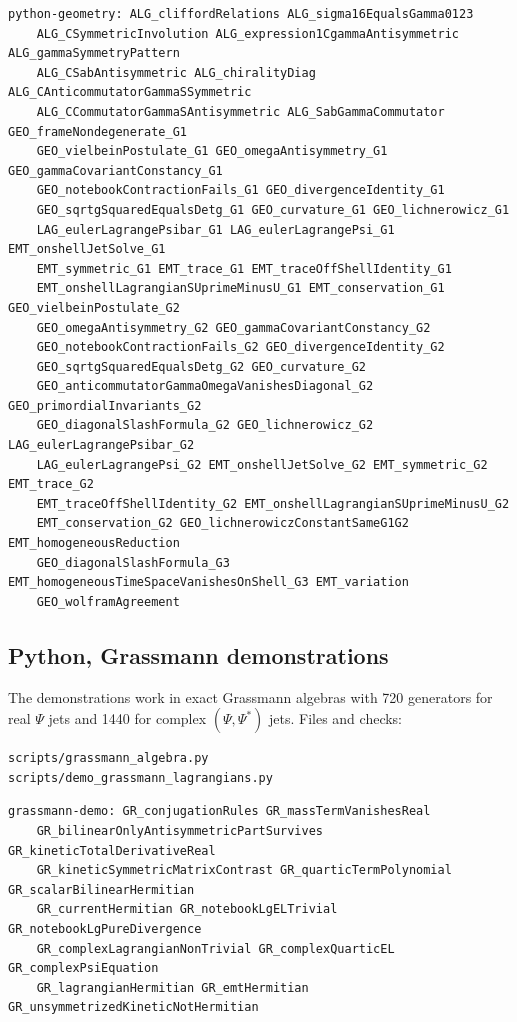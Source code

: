 \documentclass[11pt]{article}
\begin{document}
\begin{Verbatim}[fontsize=\small]
python-geometry: ALG_cliffordRelations ALG_sigma16EqualsGamma0123
    ALG_CSymmetricInvolution ALG_expression1CgammaAntisymmetric ALG_gammaSymmetryPattern
    ALG_CSabAntisymmetric ALG_chiralityDiag ALG_CAnticommutatorGammaSSymmetric
    ALG_CCommutatorGammaSAntisymmetric ALG_SabGammaCommutator GEO_frameNondegenerate_G1
    GEO_vielbeinPostulate_G1 GEO_omegaAntisymmetry_G1 GEO_gammaCovariantConstancy_G1
    GEO_notebookContractionFails_G1 GEO_divergenceIdentity_G1
    GEO_sqrtgSquaredEqualsDetg_G1 GEO_curvature_G1 GEO_lichnerowicz_G1
    LAG_eulerLagrangePsibar_G1 LAG_eulerLagrangePsi_G1 EMT_onshellJetSolve_G1
    EMT_symmetric_G1 EMT_trace_G1 EMT_traceOffShellIdentity_G1
    EMT_onshellLagrangianSUprimeMinusU_G1 EMT_conservation_G1 GEO_vielbeinPostulate_G2
    GEO_omegaAntisymmetry_G2 GEO_gammaCovariantConstancy_G2
    GEO_notebookContractionFails_G2 GEO_divergenceIdentity_G2
    GEO_sqrtgSquaredEqualsDetg_G2 GEO_curvature_G2
    GEO_anticommutatorGammaOmegaVanishesDiagonal_G2 GEO_primordialInvariants_G2
    GEO_diagonalSlashFormula_G2 GEO_lichnerowicz_G2 LAG_eulerLagrangePsibar_G2
    LAG_eulerLagrangePsi_G2 EMT_onshellJetSolve_G2 EMT_symmetric_G2 EMT_trace_G2
    EMT_traceOffShellIdentity_G2 EMT_onshellLagrangianSUprimeMinusU_G2
    EMT_conservation_G2 GEO_lichnerowiczConstantSameG1G2 EMT_homogeneousReduction
    GEO_diagonalSlashFormula_G3 EMT_homogeneousTimeSpaceVanishesOnShell_G3 EMT_variation
    GEO_wolframAgreement
\end{Verbatim}

\subsection{Python, Grassmann demonstrations}

The demonstrations work in exact Grassmann algebras with 720 generators for real $\Psi$ jets and 1440 for complex $(\Psi,\Psi^\ast)$ jets. Files and checks:

\begin{Verbatim}[fontsize=\small]
scripts/grassmann_algebra.py
scripts/demo_grassmann_lagrangians.py
\end{Verbatim}

\begin{Verbatim}[fontsize=\small]
grassmann-demo: GR_conjugationRules GR_massTermVanishesReal
    GR_bilinearOnlyAntisymmetricPartSurvives GR_kineticTotalDerivativeReal
    GR_kineticSymmetricMatrixContrast GR_quarticTermPolynomial GR_scalarBilinearHermitian
    GR_currentHermitian GR_notebookLgELTrivial GR_notebookLgPureDivergence
    GR_complexLagrangianNonTrivial GR_complexQuarticEL GR_complexPsiEquation
    GR_lagrangianHermitian GR_emtHermitian GR_unsymmetrizedKineticNotHermitian
\end{Verbatim}
\end{document}
